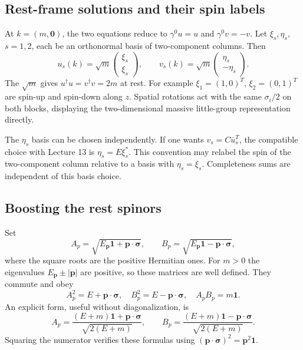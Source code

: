 \documentclass[11pt]{article}
\newcommand{\one}{\mathbf 1}
\begin{document}
\subsection{Rest-frame solutions and their spin labels}
At \(k=(m,\bm0)\), the two equations reduce to
\(\gamma^0u=u\) and \(\gamma^0v=-v\). Let
\(\xi_s,\eta_s\), \(s=1,2\), each be an orthonormal basis of
two-component columns. Then
\begin{equation}
 u_s(k)=\sqrt m\begin{pmatrix}\xi_s\\\xi_s\end{pmatrix},\qquad
 v_s(k)=\sqrt m\begin{pmatrix}\eta_s\\-\eta_s\end{pmatrix}.
 \label{eq:restspinors}
\end{equation}
The \(\sqrt m\) gives \(u^\dagger u=v^\dagger v=2m\) at rest.
For example \(\xi_1=(1,0)^T\), \(\xi_2=(0,1)^T\) are spin-up
and spin-down along \(z\). Spatial rotations act with the same
\(\sigma_i/2\) on both blocks, displaying the two-dimensional
massive little-group representation directly.

The \(\eta_s\) basis can be chosen independently. If one wants
\(v_s=C\bar u_s^T\), the compatible choice with Lecture 13 is
\(\eta_s=E\xi_s^*\). This convention may relabel the spin of the
two-component column relative to a basis with \(\eta_s=\xi_s\).
Completeness sums are independent of this basis choice.

\subsection{Boosting the rest spinors}
Set
\begin{equation}
 A_p=\sqrt{E_{\bm p}\one+\bm p\cdot\bm\sigma},\qquad
 B_p=\sqrt{E_{\bm p}\one-\bm p\cdot\bm\sigma},
 \label{eq:AB}
\end{equation}
where the square roots are the positive Hermitian ones. For \(m>0\)
the eigenvalues \(E_{\bm p}\pm|\bm p|\) are positive, so these
matrices are well defined. They commute and obey
\begin{equation}
 A_p^2=E+\bm p\cdot\bm\sigma,\quad
 B_p^2=E-\bm p\cdot\bm\sigma,\quad A_pB_p=m\one.
 \label{eq:ABids}
\end{equation}
An explicit form, useful without diagonalization, is
\begin{equation}
 A_p=\frac{(E+m)\one+\bm p\cdot\bm\sigma}{\sqrt{2(E+m)}},\qquad
 B_p=\frac{(E+m)\one-\bm p\cdot\bm\sigma}{\sqrt{2(E+m)}}.
 \label{eq:ABexplicit}
\end{equation}
Squaring the numerator verifies these formulas using
\((\bm p\cdot\bm\sigma)^2=\bm p^2\one\).
\end{document}
